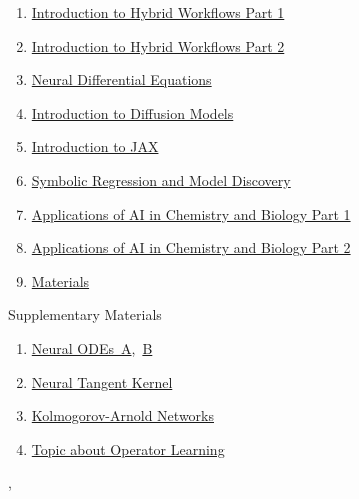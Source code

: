 \documentclass[11pt]{article}
\renewcommand{\today}{\shortmonthname[\the\month] \the \day,  \the\year}
\begin{document}
\begin{enumerate}
	\item  \href{https://mp.weixin.qq.com/s/jzBGgd9XeqOVTx5I8j34QQ}{Introduction to Hybrid Workflows Part 1}%
	\item  \href{https://mp.weixin.qq.com/s/VxdD9EywtsPI632EvBlsEw}{Introduction to Hybrid Workflows Part 2}%
	\item  \href{https://mp.weixin.qq.com/s/aCbgnQ-1bqhl9v2Adt-UQw}{Neural Differential Equations}%
	\item  \href{https://mp.weixin.qq.com/s/39QWfQbx9lCO9uCvfyE86g}{Introduction to Diffusion Models}%
	\item  \href{https://mp.weixin.qq.com/s/sdj-TSYYHWfTL6HvoneTzQ}{ Introduction to JAX}%
	\item  \href{https://mp.weixin.qq.com/s/WuNYxKklDRxUC8uTcfdcqQ}{Symbolic Regression and Model Discovery}%
	\item  \href{https://mp.weixin.qq.com/s/6NSmRsGTt4_mG1ISQ96JQg}{Applications of AI in Chemistry and Biology Part 1}%
	\item  \href{https://mp.weixin.qq.com/s/qUnkdShAVOhd-44Dc0GIQA}{Applications of AI in Chemistry and Biology Part 2}%
	\item \href{https://pan.baidu.com/s/1GwylrUaNxOWzrqXclnSiQg?pwd=1121}{Materials}
\end{enumerate}


\begin{center}
	Supplementary Materials
\end{center}

\begin{enumerate}
	\item  \href{https://mp.weixin.qq.com/s/ohloykJvnypR8mv20LJ6ZQ}{Neural ODEs\ A},\ \href{https://mp.weixin.qq.com/s/nmwFGJy3p5XqOkcjCjlzwQ}{B}
	\item \href{https://mp.weixin.qq.com/s/m6IGDKBsGjLkFWlvm07M0A}{Neural Tangent Kernel}
	\item \href{https://mp.weixin.qq.com/s/5XVJNM1ak2m2HzJ4Gb5Rww}{Kolmogorov-Arnold Networks}
	\item \href{https://mp.weixin.qq.com/s/bGy74KINQF4EBsYYx7zRvQ}{Topic about Operator Learning }
\end{enumerate}


%
\begin{flushright}
	\tiny \today 
\end{flushright}
\end{document}
